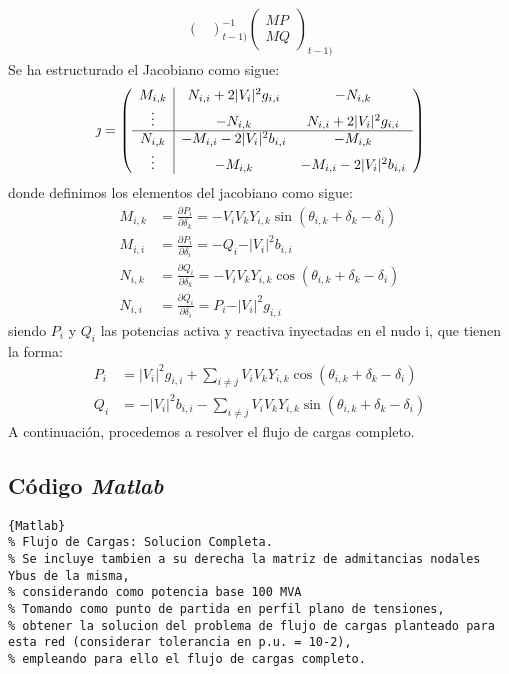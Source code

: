\documentclass[a4paper,10pt,titlepage,oneside]{article}
\begin{document}
{\begin{gather}
\begin{pmatrix}
   \end{pmatrix}^{-1}_{t-1)}
   \begin{pmatrix}
    MP \\ MQ
   \end{pmatrix}_{t-1)}
\end{gather}
Se ha estructurado el Jacobiano como sigue:
\begin{equation}
\jmath = 
\left(
  \begin{array}{c|c c}
   M_{i,k} & N_{i,i}+2\vert V_i \vert^2 g_{i,i} & -N_{i,k}\\
   \vdots  &-N_{i,k} & N_{i,i} +2\vert V_i \vert^2  g_{i,i}\\
   \hline
   N_{i,k}& -M_{i,i} - 2\vert V_i \vert^2 b_{i,i} & -M_{i,k}\\
   \vdots & -M_{i,k} & -M_{i,i} - 2\vert V_i \vert^2 b_{i,i}\\
  \end{array}
\right )
\end{equation}
donde definimos los elementos del jacobiano como sigue: 
\begin{align}
    M_{i,k} &= \frac{\partial P_i}{\partial \delta_k} = -V_i V_k Y_{i,k} \sin(\theta_{i,k}+\delta_k-\delta_i)\\
    M_{i,i} &= \frac{\partial P_i}{\partial \delta_i} = -Q_i -\vert V_i\vert^2 b_{i,i}\\
    N_{i,k} &= \frac{\partial Q_i}{\partial \delta_k} = -V_i V_k Y_{i,k} \cos(\theta_{i,k}+\delta_k-\delta_i)\\
    N_{i,i} &= \frac{\partial Q_i}{\partial \delta_i} = P_i - \vert V_i\vert^2 g_{i,i}
\end{align}
siendo $P_i$ y $Q_i$ las potencias activa y reactiva inyectadas en el nudo i, que tienen la forma:
\begin{align}
    P_i &= \vert V_i \vert ^2 g_{i,i} + \sum_{i\neq j} V_i V_k Y_{i,k} \cos(\theta_{i,k}+\delta_k-\delta_i)\\
    Q_i &= -\vert V_i \vert ^2 b_{i,i} - \sum_{i\neq j} V_i V_k Y_{i,k} \sin(\theta_{i,k}+\delta_k-\delta_i)
\end{align}
A continuación, procedemos a resolver el flujo de cargas completo.
\subsection{Código \textit{Matlab}}
\lstset{language=Matlab, breaklines=true}
\begin{lstlisting}[frame=lines]{Matlab}
% Flujo de Cargas: Solucion Completa.
% Se incluye tambien a su derecha la matriz de admitancias nodales Ybus de la misma,
% considerando como potencia base 100 MVA
% Tomando como punto de partida en perfil plano de tensiones,
% obtener la solucion del problema de flujo de cargas planteado para esta red (considerar tolerancia en p.u. = 10-2),
% empleando para ello el flujo de cargas completo.


\end{lstlisting}}
\end{document}
